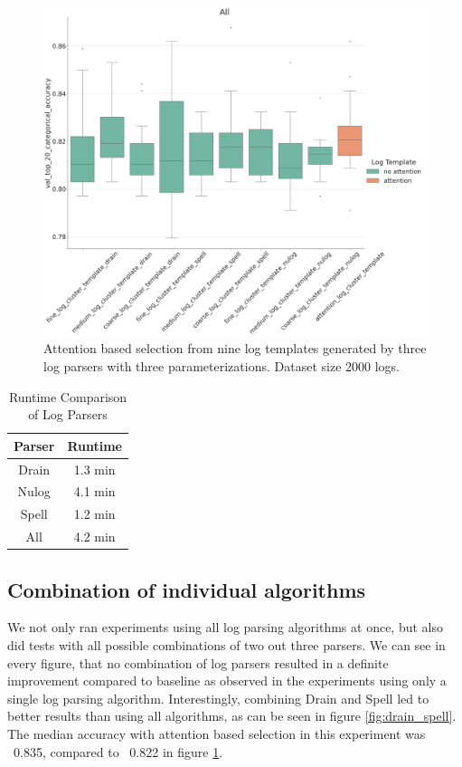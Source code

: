 \begin{figure}[H]
    \centering
    \includegraphics[keepaspectratio=true,scale=0.15]{figures/5_results/All_Huawei_2k.png}
    \caption{Attention based selection from nine log templates generated by three log parsers with three parameterizations. Dataset size 2000 logs.}
    \label{fig:all_together}
\end{figure}

\begin{table}[htbp]
  \centering

  \begin{tabular}{c c}
    \hline
    \textbf{Parser} & \textbf{Runtime} \\
    \hline
    Drain & 1.3 min \\
    Nulog & 4.1 min \\
    Spell & 1.2 min \\
    All & 4.2 min \\
    \hline
  \end{tabular}
    \caption{Runtime Comparison of Log Parsers}
  \label{tab:log_parsers_runtime}
\end{table}

\subsection{Combination of individual algorithms}
\label{sec:Results:Mixing}
We not only ran experiments using all log parsing algorithms at once, but also did tests with all possible combinations of two out three parsers. We can see in every figure, that no combination of log parsers resulted in a definite improvement compared to baseline as observed in the experiments using only a single log parsing algorithm. Interestingly, combining Drain and Spell led to better results than using all algorithms, as can be seen in figure \ref{fig:drain_spell}. The median accuracy with attention based selection in this experiment was ~0.835, compared to ~0.822 in figure \ref{fig:all_together}.

